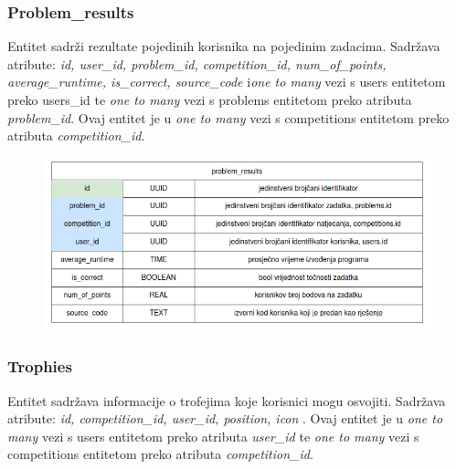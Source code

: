 				\vspace{30mm}

				\subsubsection*{Problem\_results}

				\vspace{20mm}

				Entitet  sadrži rezultate pojedinih korisnika na pojedinim zadacima. Sadržava atribute: \textit{id, user\_id, problem\_id, competition\_id, num\_of\_points, average\_runtime, is\_correct, source\_code} i\textit{one to many} vezi s users entitetom preko users\_id te \textit{one to many} vezi s problems entitetom preko atributa \textit{problem\_id}. Ovaj entitet je u \textit{one to many} vezi s competitions entitetom preko atributa \textit{competition\_id}.

				\vspace{20mm}

				\begin{figure}[htbp]
					\centering
					\includegraphics[width=\linewidth]{slike/problem_results_tablica.png}
				\end{figure}

				\vspace{30mm}

				\subsubsection*{Trophies}

				Entitet  sadržava informacije o trofejima koje korisnici mogu osvojiti. Sadržava atribute: \textit{id, competition\_id, user\_id, position, icon }. Ovaj entitet je u \textit{one to many} vezi s users entitetom preko atributa \textit{user\_id} te \textit{one to many} vezi s competitions entitetom preko atributa \textit{competition\_id}.
			
